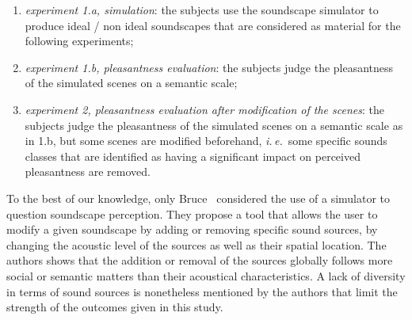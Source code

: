 \documentclass[12pt]{elsarticle}
\newcommand{\ie}{\emph{i.\,e.}}
\newcommand{\al}{\emph{et~al.}}
\begin{document}
\begin{enumerate}
\item \emph{experiment 1.a, simulation}:  the subjects use the soundscape simulator to produce ideal / non ideal soundscapes that are considered as material for the following experiments;
\item \emph{experiment 1.b, pleasantness evaluation}: the subjects judge the pleasantness of the simulated scenes on a semantic scale;
\item \emph{experiment 2, pleasantness evaluation after modification of the scenes}: the subjects judge the pleasantness of the simulated scenes on a semantic scale as in 1.b, but some scenes are modified beforehand, \ie~some specific sounds classes that are identified as having a significant impact on perceived pleasantness are removed.
\end{enumerate}


To the best of our knowledge, only Bruce~\cite{bruce2009development,bruce2014effects} considered the use of a simulator to question soundscape perception. They propose a tool that allows the user to modify a given soundscape by adding or removing specific sound sources, by changing the acoustic level of the sources as well as their spatial location. The authors shows that the addition or removal of the sources globally follows more social or semantic matters than their acoustical characteristics. A lack of diversity in terms of sound sources is nonetheless mentioned by the authors that limit the strength of the outcomes given in this study.

\end{document}
